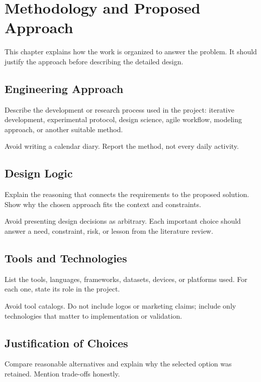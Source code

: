 \chapter{Methodology and Proposed Approach}
\label{chap:methodology-proposed-approach}

This chapter explains how the work is organized to answer the problem. It should justify the approach before describing the detailed design.

\section{Engineering Approach}
Describe the development or research process used in the project: iterative development, experimental protocol, design science, agile workflow, modeling approach, or another suitable method.


Avoid writing a calendar diary. Report the method, not every daily activity.

\section{Design Logic}
Explain the reasoning that connects the requirements to the proposed solution. Show why the chosen approach fits the context and constraints.

Avoid presenting design decisions as arbitrary. Each important choice should answer a need, constraint, risk, or lesson from the literature review.

\section{Tools and Technologies}
List the tools, languages, frameworks, datasets, devices, or platforms used. For each one, state its role in the project.

Avoid tool catalogs. Do not include logos or marketing claims; include only technologies that matter to implementation or validation.

\section{Justification of Choices}
Compare reasonable alternatives and explain why the selected option was retained. Mention trade-offs honestly.

